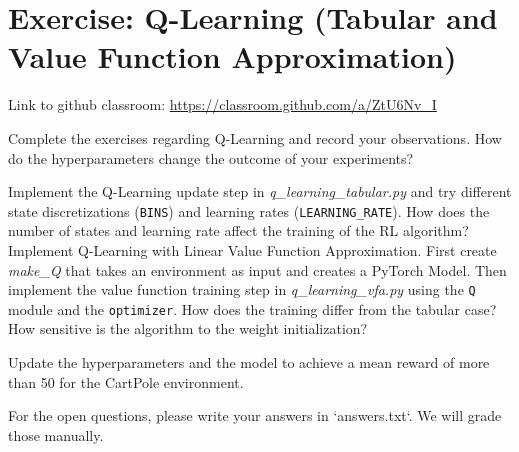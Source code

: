\documentclass{exam}
\begin{document}
\section*{Exercise: Q-Learning (Tabular and Value Function Approximation)}

Link to github classroom: \url{https://classroom.github.com/a/ZtU6Nv_I}

\noindent
Complete the exercises regarding Q-Learning and record your observations. How do the hyperparameters change the outcome of your experiments?

\begin{questions}
	Implement the Q-Learning update step in \emph{q\_learning\_tabular.py} and try different state discretizations (\texttt{BINS}) and learning rates (\texttt{LEARNING\_RATE}).
	How does the number of states and learning rate affect the training of the RL algorithm?
	Implement Q-Learning with Linear Value Function Approximation.
	First create \emph{make\_Q} that takes an environment as input and creates a PyTorch Model.
	Then implement the value function training step in \emph{q\_learning\_vfa.py} using the \texttt{Q} module and the \texttt{optimizer}.
	How does the training differ from the tabular case?
	How sensitive is the algorithm to the weight initialization?

	Update the hyperparameters and the model to achieve a mean reward of more than 50 for the CartPole environment.
\end{questions}

For the open questions, please write your answers in `answers.txt`. We will grade those manually.
\end{document}
